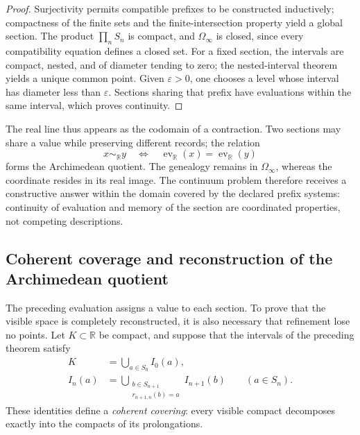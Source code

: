 \begin{proof}
Surjectivity permits compatible prefixes to be constructed inductively; compactness of the finite sets and the finite-intersection property yield a global section. The product \(\prod_nS_n\) is compact, and \(\Omega_\infty\) is closed, since every compatibility equation defines a closed set. For a fixed section, the intervals are compact, nested, and of diameter tending to zero; the nested-interval theorem yields a unique common point. Given \(\varepsilon>0\), one chooses a level whose interval has diameter less than \(\varepsilon\). Sections sharing that prefix have evaluations within the same interval, which proves continuity.
\end{proof}

The real line thus appears as the codomain of a contraction. Two sections
may share a value while preserving different records; the relation
\[
 x\sim_{\mathbb R}y
 \quad\Longleftrightarrow\quad
 \operatorname{ev}_{\mathbb R}(x)=\operatorname{ev}_{\mathbb R}(y)
\]
forms the Archimedean quotient. The genealogy remains in \(\Omega_\infty\), whereas the coordinate resides in its real image. The continuum problem therefore receives a constructive answer within the domain covered by the declared prefix systems: continuity of evaluation and memory of the section are coordinated properties, not competing descriptions.

\subsection{Coherent coverage and reconstruction of the Archimedean quotient}

The preceding evaluation assigns a value to each section. To prove that the
visible space is completely reconstructed, it is also necessary that
refinement lose no points. Let \(K\subset\mathbb R\) be compact, and suppose
that the intervals of the preceding theorem satisfy
\begin{align}
 K&=\bigcup_{a\in S_0} I_0(a),
 \label{eq:cobertura-inicial-continuo-rev3}\\
 I_n(a)&=\bigcup_{\substack{b\in S_{n+1}\\r_{n+1,n}(b)=a}}I_{n+1}(b)
 \qquad(a\in S_n).
 \label{eq:cobertura-hijos-continuo-rev3}
\end{align}
These identities define a \emph{coherent covering}: every visible
compact decomposes exactly into the compacts of its prolongations.

